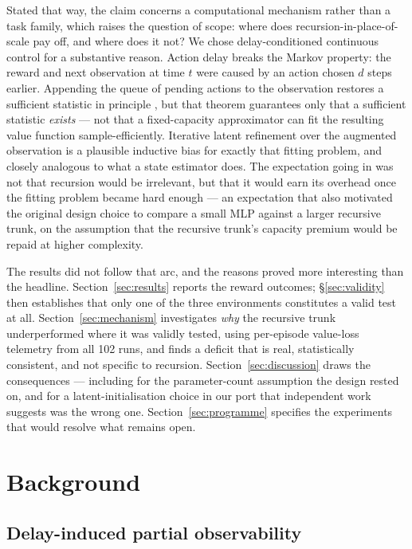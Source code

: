 \documentclass[11pt]{article}
\begin{document}
Stated that way, the claim concerns a computational mechanism rather than a task family, which raises the question of scope: where does recursion-in-place-of-scale pay off, and where does it not? We chose delay-conditioned continuous control for a substantive reason. Action delay breaks the Markov property: the reward and next observation at time $t$ were caused by an action chosen $d$ steps earlier. Appending the queue of pending actions to the observation restores a sufficient statistic in principle \citep{katsikopoulos2003delayed}, but that theorem guarantees only that a sufficient statistic \emph{exists} --- not that a fixed-capacity approximator can fit the resulting value function sample-efficiently. Iterative latent refinement over the augmented observation is a plausible inductive bias for exactly that fitting problem, and closely analogous to what a state estimator does. The expectation going in was not that recursion would be irrelevant, but that it would earn its overhead once the fitting problem became hard enough --- an expectation that also motivated the original design choice to compare a small MLP against a larger recursive trunk, on the assumption that the recursive trunk's capacity premium would be repaid at higher complexity.

The results did not follow that arc, and the reasons proved more interesting than the headline. Section~\ref{sec:results} reports the reward outcomes; \S\ref{sec:validity} then establishes that only one of the three environments constitutes a valid test at all. Section~\ref{sec:mechanism} investigates \emph{why} the recursive trunk underperformed where it was validly tested, using per-episode value-loss telemetry from all 102 runs, and finds a deficit that is real, statistically consistent, and not specific to recursion. Section~\ref{sec:discussion} draws the consequences --- including for the parameter-count assumption the design rested on, and for a latent-initialisation choice in our port that independent work suggests was the wrong one. Section~\ref{sec:programme} specifies the experiments that would resolve what remains open.

\section{Background}

\subsection{Delay-induced partial observability}
\end{document}
